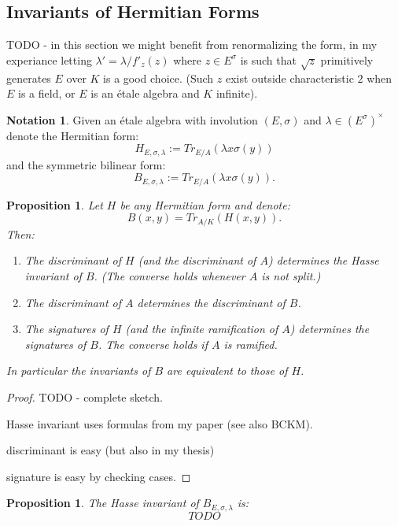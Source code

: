 \documentclass{article}
\theoremstyle{plain}
\newtheorem{proposition}[theorem]{Proposition}
\theoremstyle{definition}
\newtheorem{notation}[theorem]{Notation}
\begin{document}
\subsection{Invariants of Hermitian Forms}

TODO - in this section we might benefit from renormalizing the form, in my experiance letting $\lambda' = \lambda/f'_z(z)$ where $z\in E^\sigma$ is such that $\sqrt{z}$ primitively generates $E$ over $K$ is a good choice.
(Such $z$ exist outside characteristic $2$ when $E$ is a field, or $E$ is an \'etale algebra and $K$ infinite).

\begin{notation}
Given an \'etale algebra with involution $(E,\sigma)$ and $\lambda \in (E^\sigma)^\times$
denote the Hermitian form:
\[ H_{E,\sigma,\lambda} := Tr_{E/A}(\lambda x\sigma(y)) \]
and the symmetric bilinear form:
\[ B_{E,\sigma,\lambda} := Tr_{E/A}(\lambda x\sigma(y)). \]
\end{notation}

\begin{proposition}
Let $H$ be any Hermitian form and denote:
\[ B(x,y) = Tr_{A/K}(H(x,y)). \]
Then:
\begin{enumerate}
\item The discriminant of $H$ (and the discriminant of $A$) determines the Hasse invariant of $B$. (The converse holds whenever $A$ is not split.)
\item The discriminant of $A$ determines the discriminant of $B$.
\item The signatures of $H$ (and the infinite ramification of $A$) determines the signatures of $B$. The converse holds if $A$ is ramified.
\end{enumerate}
In particular the invariants of $B$ are equivalent to those of $H$.
\end{proposition}
\begin{proof}
TODO - complete sketch.

Hasse invariant uses formulas from my paper (see also BCKM).

discriminant is easy (but also in my thesis)

signature is easy by checking cases.
\end{proof}

\begin{proposition}
The Hasse invariant of $B_{E,\sigma,\lambda}$ is:
\[ TODO \]
\end{proposition}
\end{document}
